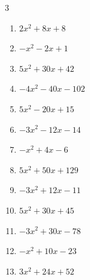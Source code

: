 \begin{multicols}{3}
\begin{enumerate}

  \item $2x^{2}+8x+8$


  \item $-x^{2}-2x+1$


  \item $5x^{2}+30x+42$


\columnbreak %

  \item $-4x^{2}-40x-102$


  \item $5x^{2}-20x+15$


  \item $-3x^{2}-12x-14$


  \item $-x^{2}+4x-6$


  \item $5x^{2}+50x+129$


  \item $-3x^{2}+12x-11$


  \item $5x^{2}+30x+45$


  \item $-3x^{2}+30x-78$


  \item $-x^{2}+10x-23$


  \item $3x^{2}+24x+52$



\end{enumerate}
\end{multicols}
